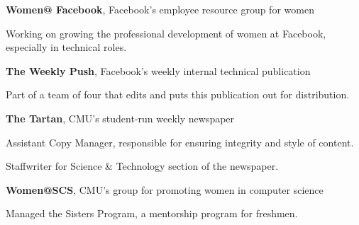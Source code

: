 \documentclass[margin, 11pt]{res} %
\begin{document}
\begin{resume}
{\bf Women@ Facebook}, Facebook's employee resource group for women

\begin{itemize} \itemsep -2pt
{\small 
\item Working on growing the professional development of women at Facebook, especially in technical roles.}
\end{itemize}

\vspace{3pt}

{\bf The Weekly Push}, Facebook's weekly internal technical publication

\begin{itemize} \itemsep -2pt
{\small \item Part of a team of four that edits and puts this publication out for distribution.}
\end{itemize}

\vspace{3pt}

{\bf The Tartan}, CMU's student-run weekly newspaper

\begin{itemize} \itemsep -2pt
{\small \item Assistant Copy Manager, responsible for ensuring integrity and style of content.
\item Staffwriter for Science \& Technology section of the newspaper.}
\end{itemize}

\vspace{3pt}

{\bf Women@SCS}, CMU's group for promoting women in computer science

\begin{itemize} \itemsep -2pt
{\small \item Managed the Sisters Program, a mentorship program for freshmen.}
\end{itemize}




\end{resume}
\end{document}
